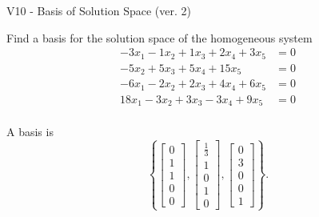 \begin{exercise}
  \begin{exerciseTitle}V10 - Basis of Solution Space (ver. 2)\end{exerciseTitle}
  \begin{exerciseStatement}
    Find a basis for the solution space of the homogeneous system 
\begin{align*}
 -3 x_ 1 -1 x_ 2 + 1 x_ 3 + 2 x_ 4 + 3 x_ 5 &= 0  \\ 
  -5 x_ 2 + 5 x_ 3 + 5 x_ 4 + 15 x_ 5 &= 0  \\ 
  -6 x_ 1 -2 x_ 2 + 2 x_ 3 + 4 x_ 4 + 6 x_ 5 &= 0  \\ 
  18 x_ 1 -3 x_ 2 + 3 x_ 3 -3 x_ 4 + 9 x_ 5 &= 0  \\ 
 \end{align*}


 
  \end{exerciseStatement}

  \begin{exerciseAnswer}
   A basis is   
\[\left\{\left[\begin{array}{c}
0 \\
1 \\
1 \\
0 \\
0
\end{array}\right] , \left[\begin{array}{c}
\frac{1}{3} \\
1 \\
0 \\
1 \\
0
\end{array}\right] , \left[\begin{array}{c}
0 \\
3 \\
0 \\
0 \\
1
\end{array}\right]\right\}.\]

  


  \end{exerciseAnswer}
\end{exercise}